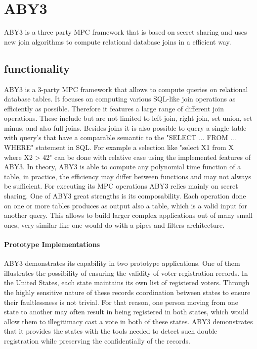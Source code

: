 \section{ABY3}
ABY3 \cite{aby3} is a three party MPC framework that is based on secret sharing and uses new join algorithms to compute relational database joins in a  efficient way.
\subsection{functionality }
ABY3 is a 3-party MPC framework that allows to compute queries on relational database tables. It focuses on computing various SQL-like join operations as efficiently as possible. Therefore it features a large range of different join operations. These include but are not limited to left join, right join, set union, set minus, and also full joins.  
Besides joins it is also possible to query a single table with query's that have a comparable semantic to the "SELECT ... FROM ... WHERE" statement in SQL. For example a selection like "select X1 from X  where X2 > 42" can be done with relative ease using the implemented features of ABY3. In theory, ABY3 is able to compute any polynomial time function of a table, in practice, the efficiency may differ between functions and may not always be sufficient. For executing its MPC operations ABY3 relies mainly on secret sharing. 
One of ABY3 great strengths is its composability. 
Each operation done on one or more tables produces as output also a table, which is a valid input for another query. This allows to build larger complex applications out of many small ones, very similar like one would do with a pipes-and-filters architecture. 


\paragraph{Prototype Implementations}
ABY3 demonstrates its capability in two prototype applications. One of them illustrates the possibility of ensuring the validity of voter registration records. In the United States, each state maintains its own list of registered voters. Through the highly sensitive nature of these records coordination between states to ensure their faultlessness is not trivial. For that reason, one person moving from one state to another may often result in being registered in both states, which would allow them to illegitimacy cast a vote in both of these states.
ABY3 demonstrates that it provides the states with  the tools needed to detect such double registration while preserving the confidentially of the records. 

